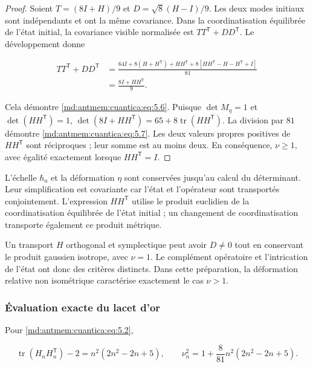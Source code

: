\begin{proof}
Soient \(T=(8I+H)/9\) et \(D=\sqrt8(H-I)/9\). Les deux modes initiaux sont indépendants et ont la même covariance. Dans la coordinatisation équilibrée de l’état initial, la covariance visible normalisée est \(TT^{\mathsf T}+DD^{\mathsf T}\). Le développement donne

\[
\begin{aligned}
TT^{\mathsf T}+DD^{\mathsf T}
&=\frac{64I+8(H+H^{\mathsf T})+HH^{\mathsf T}
+8[HH^{\mathsf T}-H-H^{\mathsf T}+I]}{81}\\
&=\frac{8I+HH^{\mathsf T}}9.
\end{aligned}
\]

Cela démontre \eqref{md:antmem:cuantica:eq:5.6}. Puisque \(\det M_\eta=1\) et \(\det(HH^{\mathsf T})=1\),
\(\det(8I+HH^{\mathsf T})=65+8\operatorname{tr}(HH^{\mathsf T})\).
La division par \(81\) démontre \eqref{md:antmem:cuantica:eq:5.7}. Les deux valeurs propres positives de \(HH^{\mathsf T}\) sont réciproques ; leur somme est au moins deux. En conséquence, \(\nu\geq1\), avec égalité exactement lorsque \(HH^{\mathsf T}=I\).
\end{proof}

L’échelle \(\hbar_a\) et la déformation \(\eta\) sont conservées jusqu’au calcul du déterminant. Leur simplification est covariante car l’état et l’opérateur sont transportés conjointement. L’expression \(HH^{\mathsf T}\) utilise le produit euclidien de la coordinatisation équilibrée de l’état initial ; un changement de coordinatisation transporte également ce produit métrique.

Un transport \(H\) orthogonal et symplectique peut avoir \(D\neq0\) tout en conservant le produit gaussien isotrope, avec \(\nu=1\). Le complément opératoire et l’intrication de l’état ont donc des critères distincts. Dans cette préparation, la déformation relative non isométrique caractérise exactement le cas \(\nu>1\).

\subsubsection{Évaluation exacte du lacet d’or}

Pour \eqref{md:antmem:cuantica:eq:5.2},

\begin{equation}
\operatorname{tr}(H_nH_n^{\mathsf T})-2
=n^2(2n^2-2n+5),\qquad
\nu_n^2=1+\frac8{81}n^2(2n^2-2n+5).
\label{md:antmem:cuantica:eq:5.8}
\end{equation}

